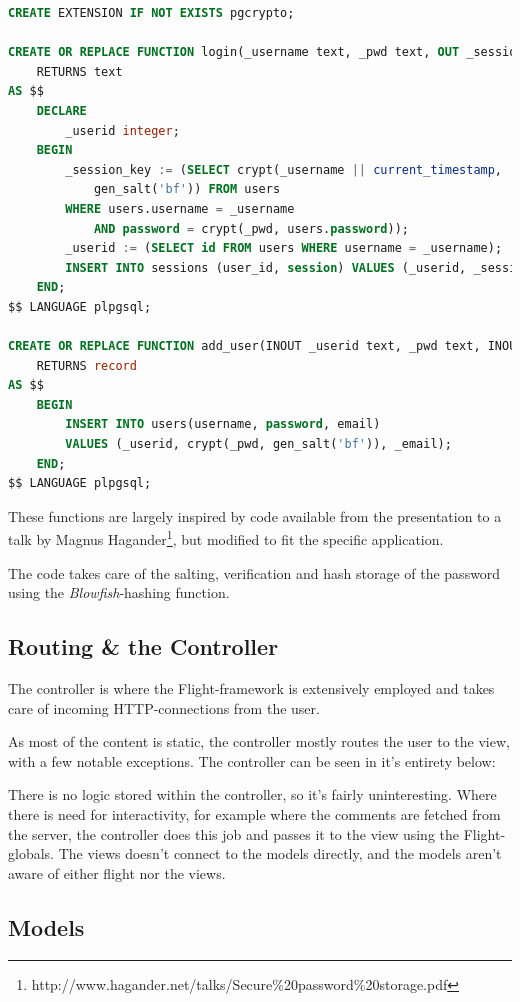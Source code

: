 \documentclass[a4paper]{scrartcl}
\begin{document}
\begin{lstlisting}[language=SQL]
CREATE EXTENSION IF NOT EXISTS pgcrypto;

CREATE OR REPLACE FUNCTION login(_username text, _pwd text, OUT _session_key text)
	RETURNS text
AS $$
	DECLARE
		_userid integer;
	BEGIN
		_session_key := (SELECT crypt(_username || current_timestamp,
			gen_salt('bf')) FROM users
		WHERE users.username = _username
			AND password = crypt(_pwd, users.password));
		_userid := (SELECT id FROM users WHERE username = _username);
		INSERT INTO sessions (user_id, session) VALUES (_userid, _session_key);
	END;
$$ LANGUAGE plpgsql;

CREATE OR REPLACE FUNCTION add_user(INOUT _userid text, _pwd text, INOUT _email text)
	RETURNS record
AS $$
	BEGIN
		INSERT INTO users(username, password, email)
		VALUES (_userid, crypt(_pwd, gen_salt('bf')), _email);
	END;
$$ LANGUAGE plpgsql;
\end{lstlisting}

These functions are largely inspired by code available from the presentation to a talk by Magnus Hagander\footnote{http://www.hagander.net/talks/Secure\%20password\%20storage.pdf}, but modified to fit the specific application.

The code takes care of the salting, verification and hash storage of the password using the \textit{Blowfish}-hashing function.

\subsection{Routing \& the Controller}

The controller is where the Flight-framework is extensively employed and takes care of incoming HTTP-connections from the user.

As most of the content is static, the controller mostly routes the user to the view, with a few notable exceptions. The controller can be seen in it's entirety below:


There is no logic stored within the controller, so it's fairly uninteresting. Where there is need for interactivity, for example where the comments are fetched from the server, the controller does this job and passes it to the view using the Flight-globals. The views doesn't connect to the models directly, and the models aren't aware of either flight nor the views.

\subsection{Models}
\end{document}
